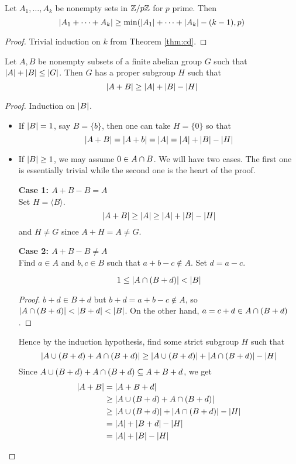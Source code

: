 \documentclass{article}
\begin{document}
\begin{ncor}\label{cor:cd-n-ary}
  Let $A_1, \dots, A_k$ be nonempty sets in $\mathbb Z/p\mathbb Z$ for $p$ prime. Then
  $$\left\lvert A_1 + \dots + A_k\right\rvert \ge \min(\left\lvert A_1\right\rvert + \dots + \left\lvert A_k\right\rvert - (k - 1), p)$$
\end{ncor}
\begin{proof}
  Trivial induction on $k$ from Theorem \ref{thm:cd}.
\end{proof}

\begin{nthm}
  Let $A, B$ be nonempty subsets of a finite abelian group $G$ such that $\left\lvert A\right\rvert + \left\lvert B\right\rvert \le \left\lvert G\right\rvert$. Then $G$ has a proper subgroup $H$ such that
  $$\left\lvert A + B\right\rvert \ge \left\lvert A\right\rvert + \left\lvert B\right\rvert - \left\lvert H\right\rvert$$
\end{nthm}
\begin{proof}
  Induction on $\left\lvert B\right\rvert$.
  \begin{itemize}
    \item If $\left\lvert B\right\rvert = 1$, say $B = \{b\}$, then one can take $H = \{0\}$ so that
    $$\left\lvert A + B\right\rvert = \left\lvert A + b\right\rvert = \left\lvert A\right\rvert = \left\lvert A\right\rvert + \left\lvert B\right\rvert - \left\lvert H\right\rvert$$
    \item If $ \left\lvert B\right\rvert \ge 1$, we may assume $0 \in A \cap B$. We will have two cases. The first one is essentially trivial while the second one is the heart of the proof.
    
    {\bf Case 1: $A + B - B = A$} \\
    Set $H = \langle B\rangle$.
    $$\left\lvert A + B\right\rvert \ge \left\lvert A\right\rvert \ge \left\lvert A\right\rvert + \left\lvert B\right\rvert - \left\lvert H\right\rvert$$
    and $H \ne G$ since $A + H = A \ne G$.

    {\bf Case 2: $A + B - B \ne A$} \\
    Find $a \in A$ and $b, c \in B$ such that $a + b - c \nin A$. Set $d = a - c$.
    \begin{claim}
      $$1 \le \left\lvert A \cap (B + d)\right\rvert < \left\lvert B\right\rvert$$
    \end{claim}
    \begin{proof}
      $b + d \in B + d$ but $b + d = a + b - c \nin A$, so $\left\lvert A \cap (B + d)\right\rvert < \left\lvert B + d\right\rvert < \left\lvert B\right\rvert$. On the other hand, $a = c + d \in A \cap (B + d)$.
    \end{proof}
    Hence by the induction hypothesis, find some strict subgroup $H$ such that
    $$\left\lvert A \cup (B + d) + A \cap (B + d)\right\rvert \ge \left\lvert A \cup (B + d)\right\rvert + \left\lvert A \cap (B + d)\right\rvert - \left\lvert H\right\rvert$$
    Since $A \cup (B + d) + A \cap (B + d) \subseteq A + B + d$, we get
    \begin{align*}
      \left\lvert A + B\right\rvert
      & = \left\lvert A + B + d\right\rvert \\
      & \ge \left\lvert A \cup (B + d) + A \cap (B + d)\right\rvert \\
      & \ge \left\lvert A \cup (B + d)\right\rvert + \left\lvert A \cap (B + d)\right\rvert - \left\lvert H\right\rvert \\
      & = \left\lvert A\right\rvert + \left\lvert B + d\right\rvert - \left\lvert H\right\rvert \\
      & = \left\lvert A\right\rvert + \left\lvert B\right\rvert - \left\lvert H\right\rvert \\
    \end{align*}
  \end{itemize}
\end{proof}
\end{document}
